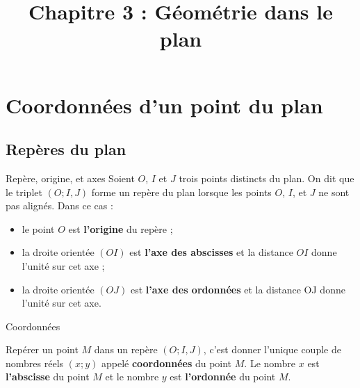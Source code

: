 \documentclass[11pt]{article}
\title{Chapitre 3 : Géométrie dans le plan}
\date{}
\author{}
\begin{document}
\maketitle\thispagestyle{fancy}

\section{Coordonnées d'un point du plan}
\subsection{Repères du plan}

\begin{defi}{Repère, origine, et axes}
  Soient $O$, $I$ et $J$ trois points distincts du plan. On dit que le triplet
  $(O; I, J)$ forme un repère du plan lorsque les points $O$, $I$, et $J$ ne
  sont pas alignés. Dans ce cas :
  \begin{itemize}
    \item le point $O$ est \textbf{l'origine} du repère ;
    \item la droite orientée $(OI)$ est \textbf{l'axe des abscisses} et la
      distance $OI$ donne l'unité sur cet axe ;
    \item la droite orientée $(OJ)$ est \textbf{l'axe des ordonnées} et la
      distance OJ donne l'unité sur cet axe.
  \end{itemize}
\end{defi}

\begin{defi}{Coordonnées}
  \label{defi1}
  \begin{minipage}{.5\textwidth}
  Repérer un point $M$ dans un repère $(O; I, J)$, c'est donner l'unique couple
  de nombres réels $(x; y)$ appelé \textbf{coordonnées} du point $M$. Le nombre
  $x$ est \textbf{l'abscisse} du point $M$ et le nombre $y$ est
  \textbf{l'ordonnée} du point $M$.
  \end{minipage}
  \begin{minipage}{.5\textwidth}
    \begin{center}
    \end{center}
  \end{minipage}
\end{defi}
\end{document}
